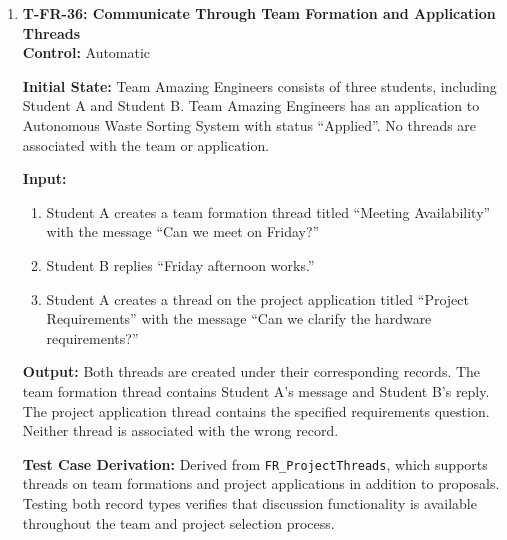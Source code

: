 \documentclass[12pt, titlepage]{article}
\begin{document}
\begin{enumerate}
\textbf{Output:} The reply is appended to the existing thread with Instructor A identified as its author and a timestamp recording when the reply was submitted. The original message, including its content, author, and timestamp, remains unchanged. Both messages are displayed in chronological order under the same thread.

\textbf{Test Case Derivation:} Derived from \texttt{FR\_ProjectThreads}. Allowing an authorized instructor to respond verifies that threads support ongoing communication, rather than only the creation of standalone messages.

\textbf{How Test Will Be Performed:} Using Playwright, authenticate as Instructor A, open the existing thread, and submit the reply. Verify that both messages are visible, the reply is attributed to Instructor A, and the original message is preserved.

\item \label{T-FR-36}\textbf{T-FR-36: Communicate Through Team Formation and Application Threads}\\

\textbf{Control:} Automatic

\textbf{Initial State:} Team Amazing Engineers consists of three students, including Student A and Student B. Team Amazing Engineers has an application to Autonomous Waste Sorting System with status ``Applied''. No threads are associated with the team or application.

\textbf{Input:}
\begin{enumerate}
    \item Student A creates a team formation thread titled ``Meeting Availability'' with the message ``Can we meet on Friday?''
    \item Student B replies ``Friday afternoon works.''
    \item Student A creates a thread on the project application titled ``Project Requirements'' with the message ``Can we clarify the hardware requirements?''
\end{enumerate}

\textbf{Output:} Both threads are created under their corresponding records. The team formation thread contains Student A's message and Student B's reply. The project application thread contains the specified requirements question. Neither thread is associated with the wrong record.

\textbf{Test Case Derivation:} Derived from \texttt{FR\_ProjectThreads}, which supports threads on team formations and project applications in addition to proposals. Testing both record types verifies that discussion functionality is available throughout the team and project selection process.


\end{enumerate}
\end{document}

